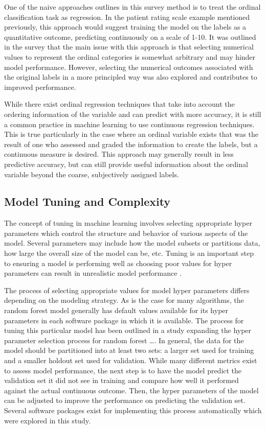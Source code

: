 \documentclass[10pt]{article}\usepackage[]{graphicx}\usepackage[]{xcolor}
\begin{document}
One of the naive approaches outlines in this survey method is to treat the ordinal classification task as regression. In the patient rating scale example mentioned previously, this approach would suggest training the model on the labels as a quantitative outcome, predicting continuously on a scale of 1-10. It was outlined in the survey that the main issue with this approach is that selecting numerical values to represent the ordinal categories is somewhat arbitrary and may hinder model performance. However, selecting the numerical outcomes associated with the original labels in a more principled way was also explored and contributes to improved performance. 

While there exist ordinal regression techniques that take into account the ordering information of the variable and can predict with more accuracy, it is still a common practice in machine learning to use continuous regression techniques. This is true particularly in the case where an ordinal variable exists that was the result of one who assessed and graded the information to create the labels, but a continuous measure is desired. This approach may generally result in less predictive accuracy, but can still provide useful information about the ordinal variable beyond the coarse, subjectively assigned labels.

\subsection{Model Tuning and Complexity}
The concept of tuning in machine learning involves selecting appropriate hyper parameters which control the structure and behavior of various aspects of the model. Several parameters may include how the model subsets or partitions data, how large the overall size of the model can be, etc. Tuning is an important step to ensuring a model is performing well as choosing poor values for hyper parameters can result in unrealistic model performance \cite{Saleh}. 

The process of selecting appropriate values for model hyper parameters differs depending on the modeling strategy. As is the case for many algorithms, the random forest model generally has default values available for its hyper parameters in each software package in which it is available. The process for tuning this particular model has been outlined in a study expanding the hyper parameter selection process for random forest \dots \cite{Quote:Probst}. In general, the data for the model should be partitioned into at least two sets: a larger set used for training and a smaller holdout set used for validation. While many different metrics exist to assess model performance, the next step is to have the model predict the validation set it did not see in training and compare how well it performed against the actual continuous outcome. Then, the hyper parameters of the model can be adjusted to improve the performance on predicting the validation set. Several software packages exist for implementing this process automatically which were explored in this study.
\end{document}

